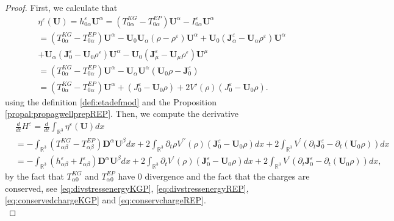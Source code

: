 \documentclass[a4paper, 15pt]{article}
\numberwithin{equation}{section}
\begin{document}
\begin{proof}
First, we calculate that 
\begin{align}
\label{eq:etaUPgproof}
&\eta^\varepsilon(\textbf{U})=h^\varepsilon_{0\alpha}\textbf{U}^\alpha=(T_{0\alpha}^{KG}-T_{0\alpha}^{EP})\textbf{U}^\alpha -I^\varepsilon_{0\alpha}\textbf{U}^\alpha \\
&=(T_{0\alpha}^{KG}-T_{0\alpha}^{EP})\textbf{U}^\alpha-\textbf{U}_0 \textbf{U}_\alpha (\rho-\rho^\varepsilon)\textbf{U}^\alpha +\textbf{U}_0 (\textbf{J}^\varepsilon_\alpha-\textbf{U}_\alpha\rho^\varepsilon)\textbf{U}^\alpha \nonumber\\
&+\textbf{U}_\alpha (\textbf{J}^\varepsilon_0-\textbf{U}_0\rho^\varepsilon)\textbf{U}^\alpha -\textbf{U}_0(\textbf{J}^\varepsilon_\mu-\textbf{U}_\mu \rho^\varepsilon)\textbf{U}^\mu\nonumber\\
&=(T_{0\alpha}^{KG}-T_{0\alpha}^{EP})\textbf{U}^\alpha-\textbf{U}_\alpha\textbf{U}^\alpha (\textbf{U}_0 \rho-\textbf{J}^\varepsilon_0) \nonumber\\
&=(T_{0\alpha}^{KG}-T_{0\alpha}^{EP})\textbf{U}^\alpha +(J^\varepsilon_0-\textbf{U}_0\rho)+2V'(\rho)(J^\varepsilon_0-\textbf{U}_0\rho).\nonumber
\end{align}
using the definition \ref{defi:etadefmod} and the Proposition \ref{propal:propagwellprepREP}. Then, we compute the derivative 
\begin{align*}
		&\frac{d}{dt}H^\varepsilon=\frac{d}{dt}\int_{\mathbb{R}^3}{\eta^\varepsilon(\textbf{U})dx}\\
  &=-\int_{\mathbb{R}^3}{(T_{\alpha\beta}^{KG}-T_{\alpha\beta}^{EP})\textbf{D}^\alpha \textbf{U}^\beta dx}+2\int_{\mathbb{R}^3}{\partial_t\rho V^{\prime\prime}(\rho)(\textbf{J}^\varepsilon_0-\textbf{U}_0\rho) dx}+2\int_{\mathbb{R}^3}{ V^{\prime}(\partial_t\textbf{J}^\varepsilon_0-\partial_t(\textbf{U}_0\rho)) dx}\\
  &=-\int_{\mathbb{R}^3}{(h^\varepsilon_{\alpha\beta}+I^\varepsilon_{\alpha\beta})\textbf{D}^\alpha \textbf{U}^\beta dx}+2\int_{\mathbb{R}^3}{\partial_tV^{\prime}(\rho)(\textbf{J}^\varepsilon_0-\textbf{U}_0\rho) dx}
+2\int_{\mathbb{R}^3}{ V^{\prime}(\partial_t\textbf{J}^\varepsilon_0-\partial_t(\textbf{U}_0\rho)) dx},
\end{align*}
by the fact that $T_{\alpha0}^{KG}$ and $T_{\alpha0}^{EP}$ have $0$ divergence and the fact that the charges are conserved, see \eqref{eq:divstressenergyKGP}, \eqref{eq:divstressenergyREP}, \eqref{eq:conservedchargeKGP} and \eqref{eq:conservchargeREP}.\\

\end{proof}
\end{document}
